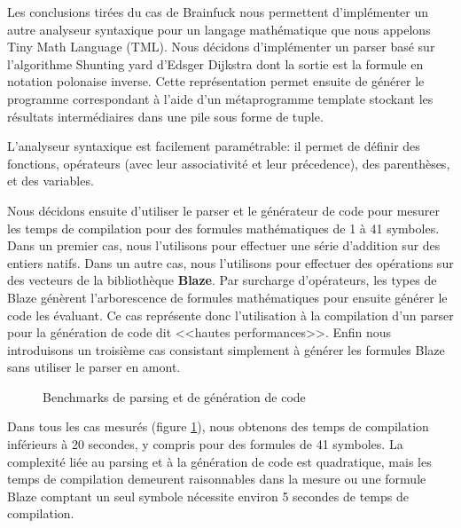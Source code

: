 \documentclass[main]{subfiles}
\begin{document}
Les conclusions tir\'ees du cas de Brainfuck nous permettent d'impl\'ementer
un autre analyseur syntaxique pour un langage math\'ematique que nous appelons
Tiny Math Language (TML). Nous d\'ecidons d'impl\'ementer un parser bas\'e sur
l'algorithme Shunting yard d'Edsger Dijkstra dont la sortie est la formule
en notation polonaise inverse. Cette repr\'esentation permet ensuite de
g\'en\'erer le programme correspondant \`a l'aide d'un m\'etaprogramme template
stockant les r\'esultats interm\'ediaires dans une pile sous forme de tuple.

L'analyseur syntaxique est facilement param\'etrable: il permet de d\'efinir des
fonctions, op\'erateurs (avec leur associativit\'e et leur pr\'ecedence),
des parenth\`eses, et des variables.

Nous d\'ecidons ensuite d'utiliser le parser et le g\'en\'erateur de code
pour mesurer les temps de compilation pour des formules math\'ematiques
de 1 \`a 41 symboles. Dans un premier cas, nous l'utilisons pour effectuer une
s\'erie d'addition sur des entiers natifs.
Dans un autre cas, nous l'utilisons pour effectuer des op\'erations sur des
vecteurs de la biblioth\`eque \textbf{Blaze}. Par surcharge d'op\'erateurs,
les types de Blaze g\'en\`erent l'arborescence de formules math\'ematiques
pour ensuite g\'en\'erer le code les \'evaluant. Ce cas repr\'esente donc
l'utilisation \`a la compilation d'un parser pour la g\'en\'eration de code dit
<<hautes performances>>.
Enfin nous introduisons un troisi\`eme cas consistant simplement \`a
g\'en\'erer les formules Blaze sans utiliser le parser en amont.

\begin{figure}[h]

\caption{Benchmarks de parsing et de g\'en\'eration de code}
\label{fig:tml-ctbench-fr}
\end{figure}

Dans tous les cas mesur\'es (figure \ref{fig:tml-ctbench-fr}), nous obtenons
des temps de compilation inf\'erieurs \`a 20 secondes, y compris pour des
formules de 41 symboles.
La complexit\'e  li\'ee au parsing et \`a la g\'en\'eration de code
est quadratique, mais les temps de compilation demeurent raisonnables
dans la mesure ou une formule Blaze comptant un seul symbole n\'ecessite
environ 5 secondes de temps de compilation.
\end{document}
